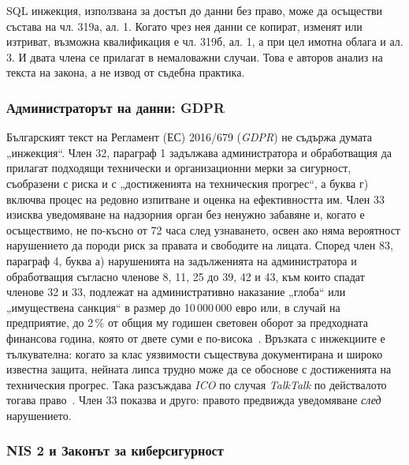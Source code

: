 SQL инжекция, използвана за достъп до данни без право, може да осъществи състава на
чл. 319а, ал. 1. Когато чрез нея данни се копират, изменят или изтриват, възможна
квалификация е чл. 319б, ал. 1, а при цел имотна облага и ал. 3. И двата члена
се прилагат в немаловажни случаи. Това е авторов
анализ на текста на закона, а не извод от съдебна практика.

\subsubsection{Администраторът на данни: GDPR}

Българският текст на Регламент (ЕС) 2016/679 (\textit{GDPR}) не съдържа думата
„инжекция“. Член 32, параграф 1
задължава администратора и обработващия да прилагат подходящи технически и
организационни мерки за сигурност, съобразени с риска и с „достиженията на
техническия прогрес“, а буква г) включва процес на редовно изпитване и оценка на
ефективността им. Член 33 изисква уведомяване на надзорния орган без ненужно
забавяне и, когато е осъществимо, не по-късно от 72 часа след узнаването, освен ако
няма вероятност нарушението да породи риск за правата и свободите на лицата. Според
член 83, параграф 4, буква а) нарушенията на задълженията на администратора и
обработващия съгласно членове 8, 11, 25 до 39, 42 и 43, към които спадат членове 32
и 33, подлежат на административно наказание „глоба“ или „имуществена санкция“ в
размер до 10\,000\,000 евро или, в случай на предприятие, до 2\,\% от общия му
годишен световен оборот за предходната финансова година, която от двете суми е
по-висока~\cite{gdpr}. Връзката с инжекциите е тълкувателна: когато за клас уязвимости
съществува документирана и широко известна защита, нейната липса трудно може да се
обоснове с достиженията на техническия прогрес. Така разсъждава \textit{ICO} по
случая \textit{TalkTalk} по действалото тогава право~\cite{ico_talktalk_2016}. Член 33
показва и друго: правото предвижда уведомяване \textit{след} нарушението.

\subsubsection{NIS 2 и Законът за киберсигурност}

